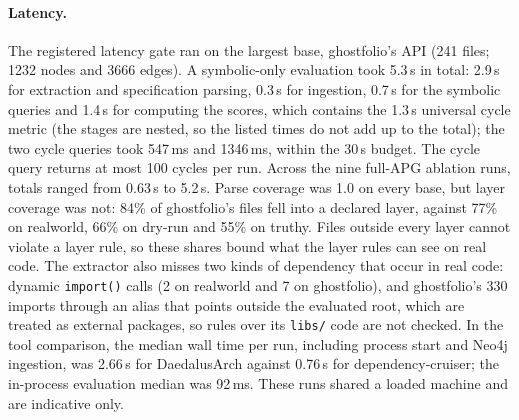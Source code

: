 \documentclass[10pt,a4paper]{article}
\newcommand{\tool}{DaedalusArch}
\newcommand{\dc}{dependency-cruiser}
\begin{document}
\paragraph{Latency.}
The registered latency gate ran on the largest base, ghostfolio's API (241 files; 1232 nodes and 3666 edges).
A symbolic-only evaluation took 5.3\,s in total: 2.9\,s for extraction and specification parsing, 0.3\,s for
ingestion, 0.7\,s for the symbolic queries and 1.4\,s for computing the scores, which contains the 1.3\,s universal
cycle metric (the stages are nested, so the listed times do not add up to the total); the two cycle queries took
547\,ms and 1346\,ms, within the 30\,s budget. The cycle query returns at most 100 cycles per run.
Across the nine full-APG ablation runs, totals ranged from 0.63\,s to 5.2\,s. %
Parse coverage was 1.0 on every base, but layer coverage was not: 84\% of ghostfolio's files fell into a declared
layer, against 77\% on realworld, 66\% on dry-run and 55\% on truthy. Files outside every layer cannot violate a
layer rule, so these shares bound what the layer rules can see on real code.
The extractor also misses two kinds of dependency that occur in real code: dynamic \texttt{import()} calls (2 on
realworld and 7 on ghostfolio), and ghostfolio's 330 imports through an alias that points outside the evaluated
root, which are treated as external packages, so rules over its \texttt{libs/} code are not checked.
In the tool comparison, the median wall time per run, including process start and Neo4j ingestion, was 2.66\,s for
\tool{} against 0.76\,s for \dc{}; the in-process evaluation median was 92\,ms. These runs shared a loaded machine
and are indicative only. %
\end{document}
